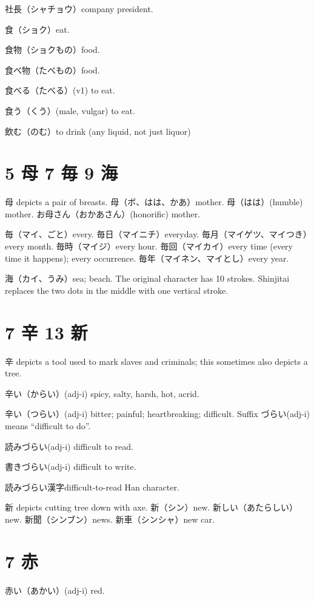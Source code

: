 社長（シャチョウ）company president.

食（ショク）eat.

食物（ショクもの）food.

食べ物（たべもの）food.

食べる（たべる）(v1) to eat.

食う（くう）(male, vulgar) to eat.

飲む（のむ）to drink (any liquid, not just liquor)

\section{5 母 7 毎 9 海}

母 depicts a pair of breasts.
母（ボ、はは、かあ）mother.
母（はは）(humble) mother.
お母さん（おかあさん）(honorific) mother.

毎（マイ、ごと）every.
毎日（マイニチ）everyday.
毎月（マイゲツ、マイつき）every month.
毎時（マイジ）every hour.
毎回（マイカイ）every time (every time it happens); every occurrence.
毎年（マイネン、マイとし）every year.

海（カイ、うみ）sea; beach.
The original character has 10 strokes.
Shinjitai replaces the two dots in the middle
with one vertical stroke.

\section{7 辛 13 新}

辛 depicts a tool used to mark slaves and criminals;
this sometimes also depicts a tree.

辛い（からい）(adj-i) spicy, salty, harsh, hot, acrid.

辛い（つらい）(adj-i) bitter; painful; heartbreaking; difficult.
Suffix づらい(adj-i) means ``difficult to do''.

読みづらい(adj-i) difficult to read.

書きづらい(adj-i) difficult to write.

読みづらい漢字difficult-to-read Han character.

新 depicts cutting tree down with axe.
新（シン）new.
新しい（あたらしい）new.
新聞（シンブン）news.
新車（シンシャ）new car.

\section{7 赤}

赤い（あかい）(adj-i) red.

